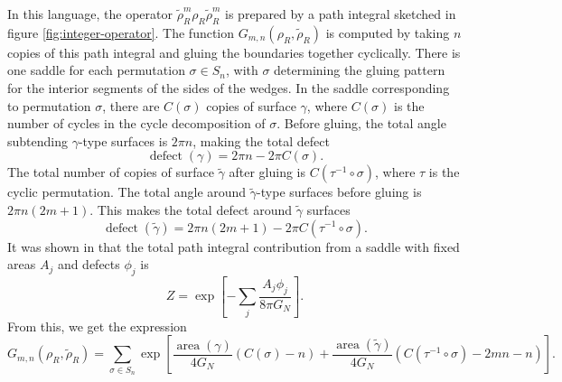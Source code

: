 \documentclass[a4paper,11pt]{article}
\renewcommand{\tilde}{\widetilde}
\newcommand{\area}{\operatorname{area}}
\begin{document}
In this language, the operator $\tilde{\rho}_{R}^m \rho_{R} \tilde{\rho}_R^m$ is prepared by a path integral sketched in figure \ref{fig:integer-operator}. The function $G_{m,n}(\rho_R, \tilde{\rho}_{R})$ is computed by taking $n$ copies of this path integral and gluing the boundaries together cyclically. There is one saddle for each permutation $\sigma \in S_n$, with $\sigma$ determining the gluing pattern for the interior segments of the sides of the wedges. In the saddle corresponding to permutation $\sigma$, there are $C(\sigma)$ copies of surface $\gamma$, where $C(\sigma)$ is the number of cycles in the cycle decomposition of $\sigma$. Before gluing, the total angle subtending $\gamma$-type surfaces is $2 \pi n$, making the total defect
\begin{equation}
    \operatorname{defect}(\gamma) = 2 \pi n - 2 \pi C(\sigma).
\end{equation}
The total number of copies of surface $\tilde{\gamma}$ after gluing is $C(\tau^{-1} \circ \sigma)$, where $\tau$ is the cyclic permutation. The total angle around $\tilde{\gamma}$-type surfaces before gluing is $2 \pi n (2 m + 1)$. This makes the total defect around $\tilde{\gamma}$ surfaces
\begin{equation}
    \operatorname{defect}(\tilde{\gamma}) = 2 \pi n (2 m + 1) - 2 \pi C(\tau^{-1} \circ \sigma).
\end{equation}
It was shown in \cite{fixed-area-DHM} that the total path integral contribution from a saddle with fixed areas $A_j$ and defects $\phi_j$ is
\begin{equation}
    Z = \exp\left[ - \sum_{j} \frac{A_j \phi_j}{8 \pi G_N} \right].
\end{equation}
From this, we get the expression
\begin{equation}
    G_{m, n}(\rho_R, \tilde{\rho}_{R})
        = \sum_{\sigma \in S_n} \exp\left[ \frac{\area(\gamma)}{4 G_N} (C(\sigma) -  n) + \frac{\area(\tilde{\gamma})}{4 G_N} (C(\tau^{-1} \circ \sigma) - 2mn - n)   \right].
\end{equation}
\end{document}
